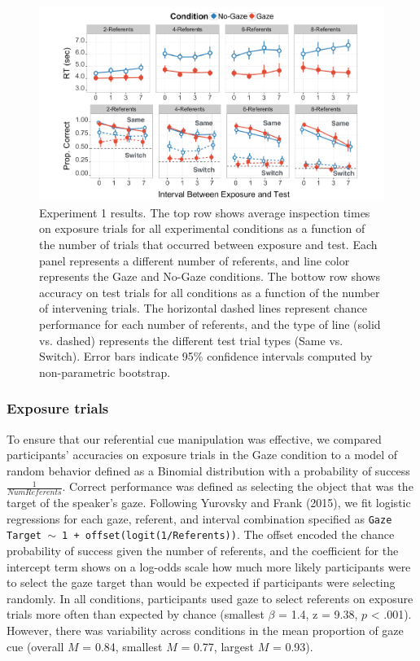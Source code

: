 \documentclass[authoryear, review]{elsarticle}
\newenvironment{CodeChunk}{}{}
\begin{document}
\begin{CodeChunk}
\begin{figure}[tb]

{\centering \includegraphics[width=1\linewidth]{figs/expt1-plot-1} 

}

\caption[Experiment 1 results]{Experiment 1 results. The top row shows average inspection times on exposure trials for all experimental conditions as a function of the number of trials that occurred between exposure and test. Each panel represents a different number of referents, and line color represents the Gaze and No-Gaze conditions. The bottow row shows accuracy on test trials for all conditions as a function of the number of intervening trials. The horizontal dashed lines represent chance performance for each number of referents, and the type of line (solid vs. dashed) represents the different test trial types (Same vs. Switch). Error bars indicate 95\% confidence intervals computed by non-parametric bootstrap.}\label{fig:expt1-plot}
\end{figure}
\end{CodeChunk}

\subsubsection{Exposure trials}\label{exposure-trials}

To ensure that our referential cue manipulation was effective, we
compared participants' accuracies on exposure trials in the Gaze
condition to a model of random behavior defined as a Binomial
distribution with a probability of success \(\frac{1}{Num Referents}\).
Correct performance was defined as selecting the object that was the
target of the speaker's gaze. Following Yurovsky and Frank (2015), we
fit logistic regressions for each gaze, referent, and interval
combination specified as
\texttt{Gaze Target $\sim$ 1 + offset(logit(1/Referents))}. The offset
encoded the chance probability of success given the number of referents,
and the coefficient for the intercept term shows on a log-odds scale how
much more likely participants were to select the gaze target than would
be expected if participants were selecting randomly. In all conditions,
participants used gaze to select referents on exposure trials more often
than expected by chance (smallest \(\beta\) = 1.4, z = 9.38, \(p\)
\textless{} .001). However, there was variability across conditions in
the mean proportion of gaze cue (overall \(M\) = 0.84, smallest \(M\) =
0.77, largest \(M\) = 0.93).
\end{document}

